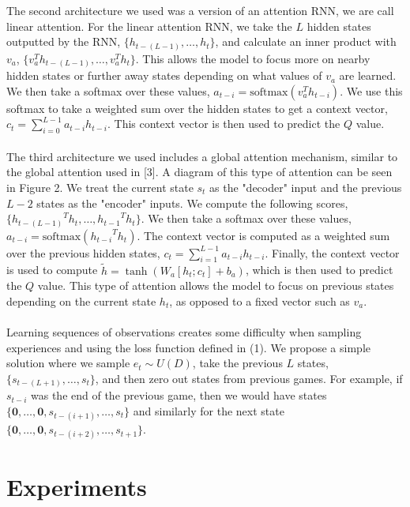 \documentclass{article}
\begin{document}
The second architecture we used was a version of an attention RNN, we are call 
linear attention. For the linear attention RNN, we take the $L$ hidden states
outputted by the RNN, $\{h_{t-(L-1)}, \dots, h_{t}\}$, and calculate an inner
product with $v_a$, $\{v_a^Th_{t-(L-1)}, \dots, v_a^Th_{t}\}$. This allows the
model to focus more on nearby hidden states or further away states depending on
what values of $v_a$ are learned. We then take a softmax over these values,
$a_{t-i} = \text{softmax}(v_a^Th_{t-i})$. We use this softmax to take a weighted
sum over the hidden states to get a context vector,
$c_t = \sum_{i=0}^{L-1}a_{t-i}h_{t-i}$. This context vector is then used to predict
the $Q$ value. \\
\\
The third architecture we used includes a global attention mechanism, similar to the global attention
used in [3]. A diagram of this type of attention can be seen in Figure 2. We treat
the current state $s_t$ as the "decoder" input and the previous $L - 2$ states as
the "encoder" inputs. We compute the following scores,
$\{{h_{t-(L-1)}}^Th_t, \dots, {h_{t-1}}^Th_t\}$. We then take a softmax over these
values, $a_{t-i} = \text{softmax}({h_{t-i}}^Th_t)$. The context vector is computed
as a weighted sum over the previous hidden states, $c_t = \sum_{i=1}^{L-1}a_{t-i}h_{t-i}$.
Finally, the context vector is used to compute $\tilde{h} = \tanh(W_a[h_t;c_t] + b_a)$,
which is then used to predict the $Q$ value. This type of attention allows the model
to focus on previous states depending on the current state $h_t$, as opposed to a
fixed vector such as $v_a$. \\
\\
Learning sequences of observations creates some difficulty when sampling
experiences and using the loss function defined in (1). We propose a simple
solution where we sample $e_t \sim U(D)$, take the previous $L$ states,
$\{s_{t-(L+1)}, \dots, s_t\}$, and then zero out states from previous games. For example,
if $s_{t-i}$ was the end of the previous game, then we would have states
$\{\mathbf{0}, \dots, \mathbf{0}, s_{t-(i+1)}, \dots, s_t\}$ and similarly for the
next state $\{\mathbf{0}, \dots, \mathbf{0},s_{t-(i+2)}, \dots, s_{t+1}\}$.

\section{Experiments}
\end{document}
